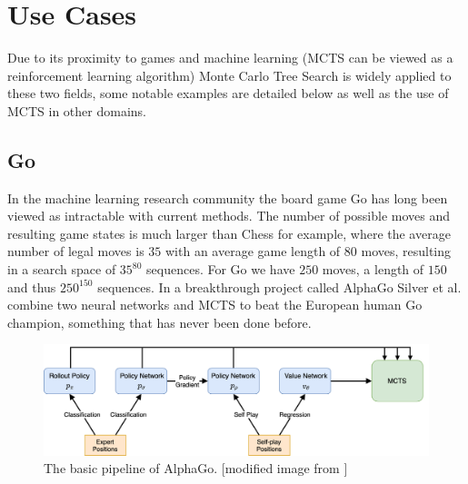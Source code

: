 \section{Use Cases}
\label{sec:use_cases}
Due to its proximity to games and machine learning (MCTS can be viewed as a reinforcement learning algorithm) Monte Carlo Tree Search is widely applied to these two fields, some notable examples are detailed below as well as the use of MCTS in other domains. 
\subsection{Go} 
\label{ss:go}
In the machine learning research community the board game Go has long been viewed as intractable with current methods. The number of possible moves and resulting game states is much larger than Chess for example, where the average number of legal moves is $35$ with an average game length of $80$ moves, resulting in a search space of $35^{80}$ sequences. For Go we have $250$ moves, a length of $150$ and thus $250^{150}$ sequences. In a breakthrough project called AlphaGo Silver et al. \cite{silver2017mastering} combine two neural networks and MCTS to beat the European human Go champion, something that has never been done before.

\begin{figure}[ht]
    \centering
    \includegraphics[width=\textwidth]{img/alphago.png}
    \caption{The basic pipeline of AlphaGo. [modified image from \cite{silver2017mastering}]}
    \label{fig:alphago}
\end{figure}

